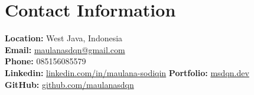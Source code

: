 \section*{Contact Information}
\textbf{Location:} West Java, Indonesia\\
\textbf{Email:} \href{mailto:maulanasdqn@gmail.com}{maulanasdqn@gmail.com} \\
\textbf{Phone:} 085156085579 \\
\textbf{Linkedin:} \href{https://linkedin.com/in/maulana-sodiqin}{linkedin.com/in/maulana-sodiqin}
\textbf{Portfolio:} \href{https://msdqn.dev}{msdqn.dev} \\
\textbf{GitHub:} \href{https://github.com/maulanasdqn}{github.com/maulanasdqn} \\
